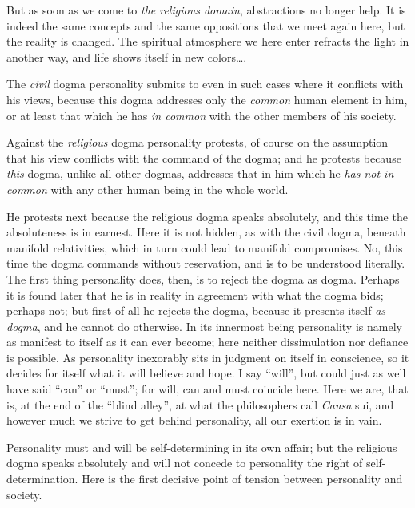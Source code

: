 \documentclass[12pt,a4paper,openany]{book}
\newcommand{\opage}[1]{\marginnote{\footnotesize\textit{[#1]}}}
\begin{document}
But as soon as we come to \emph{the religious domain}, abstractions no longer help.
It is indeed the same concepts and the same oppositions that we meet again here, but the
reality is changed. The spiritual atmosphere we here enter refracts the light in another
way, and life shows itself in new colors\dots{}.

The \emph{civil} dogma personality submits to even in such cases where it conflicts with
his views, because this dogma addresses only the \emph{common} human element in him, or
at least that which he has \emph{in common} with the other members of his society.

Against the \emph{religious} dogma personality protests, of course on the assumption that
his view conflicts with the command of the dogma; and he protests because \emph{this}
dogma, unlike all other dogmas, addresses that in him which he \emph{has not in common}
with any other human being in the whole world.

He protests next because the religious dogma speaks absolutely, and this time the
absoluteness is in earnest. Here it is not hidden, as with the civil dogma, beneath
manifold relativities, which in turn could lead to manifold compromises. No, this time
the dogma commands without reservation, and is to be understood literally. The first
thing personality does, then, is to reject the dogma as dogma. Perhaps it is found later
that he is in reality in agreement with what the dogma bids; perhaps not; but first of
all he rejects the dogma, because it presents itself \emph{as dogma}, and he cannot do
otherwise. In its innermost being personality is namely as manifest to itself as it can
ever become; here neither dissimulation nor defiance is possible. As personality
inexorably sits in judgment on itself in conscience, so it decides
\setcounter{footnote}{0}%
\opage{229}for itself what it will believe and hope. I say ``will'', but could just as well
have said ``can'' or ``must''; for will, can and must coincide here. Here we are, that
is, at the end of the ``blind alley'', at what the philosophers call \textit{Causa} sui,
and however much we strive to get behind personality, all our exertion is in vain.

Personality must and will be self-determining in its own affair; but the religious dogma
speaks absolutely and will not concede to personality the right of self-determination.
Here is the first decisive point of tension between personality and society.
\end{document}
